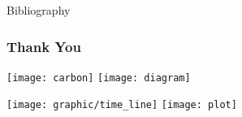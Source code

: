 \documentclass{beamer}
\begin{document}
\begin{frame}{Bibliography}


\end{frame}

\begin{frame}
	\frametitle{Thank You} 
	\begin{center}
	\texttt{[image: carbon]}\hspace{2em}
	\texttt{[image: diagram]}
	\end{center}
	\begin{center}
	\texttt{[image: graphic/time\_line]}\hspace{2em}
	\texttt{[image: plot]}
\end{center}
\end{frame}
\end{document}
